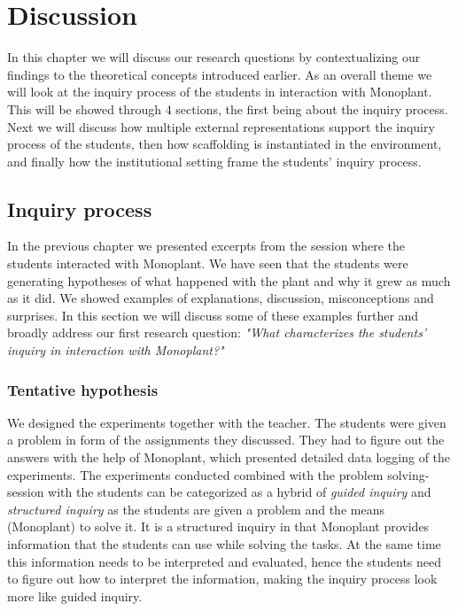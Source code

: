 \chapter{Discussion}
In this chapter we will discuss our research questions by contextualizing our findings to the theoretical concepts introduced earlier. As an overall theme we will look at the inquiry process of the students in interaction with Monoplant. This will be showed through 4 sections, the first being about the inquiry process. Next we will discuss how multiple external representations support the inquiry process of the students, then how scaffolding is instantiated in the environment, and finally how the institutional setting frame the students' inquiry process.


\section{Inquiry process}
In the previous chapter we presented excerpts from the session where the students interacted with Monoplant. We have seen that the students were generating hypotheses of what happened with the plant and why it grew as much as it did. We showed examples of explanations, discussion, misconceptions and surprises. In this section we will discuss some of these examples further and broadly address our first research question: \emph{"What characterizes the students’ inquiry in interaction with Monoplant?"}

\subsection{Tentative hypothesis}
We designed the experiments together with the teacher. The students were given a problem in form of the assignments they discussed. They had to figure out the answers with the help of Monoplant, which presented detailed data logging of the experiments. The experiments conducted combined with the problem solving-session with the students can be categorized as a hybrid of \emph{guided inquiry} and \emph{structured inquiry} \citetext{\citet{staver1987analysis}, referenced in \citealp{prince2006inductive}} as the students are given a problem and the means (Monoplant) to solve it. It is a structured inquiry in that Monoplant provides information that the students can use while solving the tasks. At the same time this information needs to be interpreted and evaluated, hence the students need to figure out how to interpret the information, making the inquiry process look more like guided inquiry.

